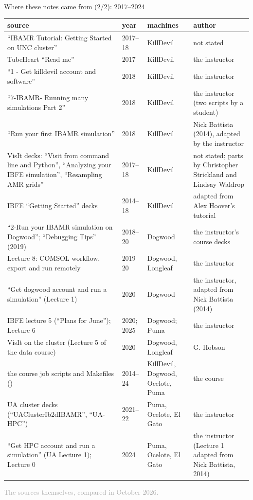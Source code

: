 \documentclass[aspectratio=169,11pt]{beamer}
\newcommand{\sourcecredit}[1]{\vfill\begin{flushright}\tiny\textcolor{DarkGray}{#1}\end{flushright}}
\begin{document}
\begin{frame}{Where these notes came from (2/2): 2017--2024}
\label{fr:sources2}
\tiny
\renewcommand{\arraystretch}{1.12}
\setlength{\tabcolsep}{3pt}
\begin{tabular}{@{}L{0.42\textwidth}L{0.08\textwidth}L{0.2\textwidth}L{0.25\textwidth}@{}}
\toprule
source & year & machines & author \\
\midrule
``IBAMR Tutorial: Getting Started on UNC cluster'' & 2017--18 & KillDevil & not stated \\
TubeHeart ``Read me'' & 2017 & KillDevil & the instructor \\
``1 - Get killdevil account and software'' & 2018 & KillDevil & the instructor \\
``7-IBAMR- Running many simulations Part 2'' & 2018 & KillDevil & the instructor (two scripts by a student) \\
``Run your first IBAMR simulation'' & 2018 & KillDevil & Nick Battista (2014), adapted by the instructor \\
VisIt decks: ``Visit from command line and Python'', ``Analyzing your IBFE simulation'', ``Resampling AMR grids'' & 2017--18 & KillDevil & not stated; parts by Christopher Strickland and Lindsay Waldrop \\
IBFE ``Getting Started'' decks & 2014--18 & KillDevil & adapted from Alex Hoover's tutorial \\
``2-Run your IBAMR simulation on Dogwood''; ``Debugging Tips'' (2019) & 2018--20 & Dogwood & the instructor's course decks \\
Lecture 8: COMSOL workflow, export and run remotely & 2019--20 & Dogwood, Longleaf & the instructor \\
``Get dogwood account and run a simulation'' (Lecture 1) & 2020 & Dogwood & the instructor, adapted from Nick Battista (2014) \\
IBFE lecture 5 (``Plans for June''); Lecture 6 & 2020; 2025 & Dogwood; Puma & the instructor \\
VisIt on the cluster (Lecture 5 of the data course) & 2020 & Dogwood, Longleaf & G. Hobson \\
the course job scripts and Makefiles () & 2014--24 & KillDevil, Dogwood, Ocelote, Puma & the course \\
UA cluster decks (``UAClusterIb2dIBAMR'', ``UA-HPC'') & 2021--22 & Puma, Ocelote, El Gato & the instructor \\
``Get HPC account and run a simulation'' (UA Lecture 1); Lecture 0 & 2024 & Puma, Ocelote, El Gato & the instructor (Lecture 1 adapted from Nick Battista, 2014) \\
\bottomrule
\end{tabular}
\sourcecredit{The sources themselves, compared in October 2026.}
\end{frame}
\end{document}
